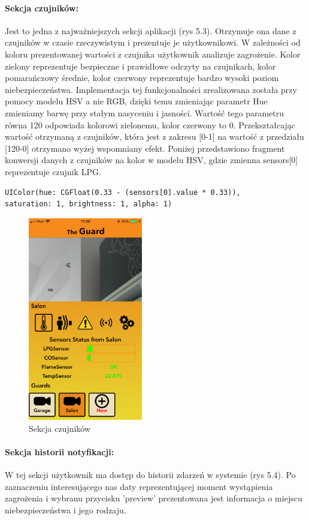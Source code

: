 \paragraph{Sekcja czujników:}
Jest to jedna z najważniejszych sekcji aplikacji (rys 5.3).  Otrzymuje ona dane z czujników w czasie rzeczywistym i prezentuje je użytkownikowi.  W zależności od koloru prezentowanej wartości z czujnika użytkownik analizuje zagrożenie. Kolor zielony reprezentuje bezpieczne i prawidłowe odczyty na czujnikach, kolor pomarańczowy średnie, kolor czerwony reprezentuje bardzo wysoki poziom niebezpieczeństwa. Implementacja tej funkcjonalności zrealizowana została przy pomocy modelu HSV a nie RGB, dzięki temu zmieniając parametr Hue zmieniamy barwę przy stałym nasyceniu i jasności. Wartość tego parametru równa 120\textdegree{} odpowiada kolorowi zielonemu, kolor czerwony to 0\textdegree{}. Przekształcając wartość otrzymaną z czujników, która jest z zakresu [0-1] na wartość z przedziału [120-0] otrzymano wyżej wspomniany efekt. 
Poniżej przedstawiono fragment konwersji danych z czujników na kolor w modelu HSV, gdzie zmienna sensors[0] reprezentuje czujnik LPG.
\begin{verbatim}
UIColor(hue: CGFloat(0.33 - (sensors[0].value * 0.33)),
saturation: 1, brightness: 1, alpha: 1)
\end{verbatim}

\begin{figure}[h]
	\centering
	\includegraphics[width=5cm]{sensors.png}
	\caption{Sekcja czujników}
\end{figure}

\paragraph{Sekcja historii notyfikacji:}
W tej sekcji użytkownik ma dostęp do historii zdarzeń w systemie (rys 5.4). Po zaznaczeniu interesującego nas daty reprezentującej moment wystąpienia zagrożenia i wybranu przycisku 'preview' prezentowana jest informacja o miejscu niebezpieczeństwa i jego rodzaju. 

